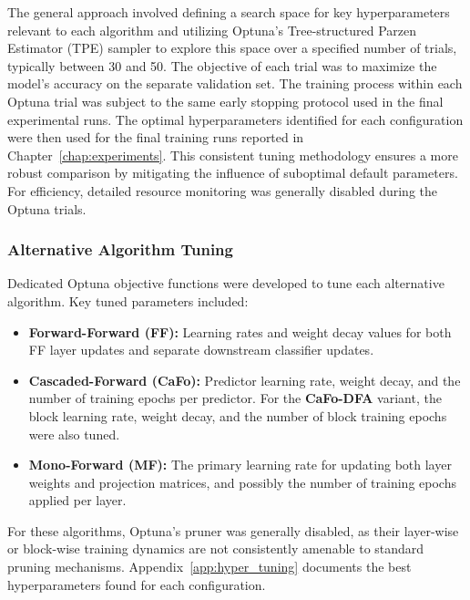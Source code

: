 The general approach involved defining a search space for key hyperparameters relevant to each algorithm and utilizing Optuna's Tree-structured Parzen Estimator (TPE) sampler \cite{bergstra2011algorithms} to explore this space over a specified number of trials, typically between 30 and 50. The objective of each trial was to maximize the model's accuracy on the separate validation set. The training process within each Optuna trial was subject to the same early stopping protocol used in the final experimental runs. The optimal hyperparameters identified for each configuration were then used for the final training runs reported in Chapter~\ref{chap:experiments}. This consistent tuning methodology ensures a more robust comparison by mitigating the influence of suboptimal default parameters. For efficiency, detailed resource monitoring was generally disabled during the Optuna trials.

\subsubsection{Alternative Algorithm Tuning}
\label{subsec:methodology_hyper_alt}
Dedicated Optuna objective functions were developed to tune each alternative algorithm. Key tuned parameters included:
\begin{itemize}
    \item \textbf{Forward-Forward (FF):} Learning rates and weight decay values for both FF layer updates and separate downstream classifier updates.
    \item \textbf{Cascaded-Forward (CaFo):} Predictor learning rate, weight decay, and the number of training epochs per predictor. For the \textbf{CaFo-DFA} variant, the block learning rate, weight decay, and the number of block training epochs were also tuned.
    \item \textbf{Mono-Forward (MF):} The primary learning rate for updating both layer weights and projection matrices, and possibly the number of training epochs applied per layer.
\end{itemize}
For these algorithms, Optuna's pruner was generally disabled, as their layer-wise or block-wise training dynamics are not consistently amenable to standard pruning mechanisms. Appendix~\ref{app:hyper_tuning} documents the best hyperparameters found for each configuration.

